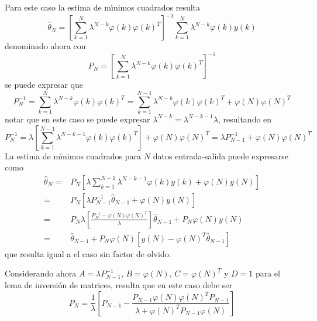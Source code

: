 Para este caso la estima de m{\'\i}nimos cuadrados resulta
\begin{equation}\label{a_2}
\hat{\theta}_N=\left[\sum_{k=1}^{N}\lambda^{N-k}\varphi(k)\varphi(k)^T\right]^{-1}\sum_{k=1}^{N}\lambda^{N-k}\varphi(k)y(k)
\end{equation}
denominado ahora con
\begin{equation}\label{a_3}
    P_{N}=\left[\sum_{k=1}^{N}\lambda^{N-k}\varphi(k)\varphi(k)^T\right]^{-1}
\end{equation}
se puede expresar que
\begin{equation}
    P^{-1}_{N}=\sum_{k=1}^{N}\lambda^{N-k}\varphi(k)\varphi(k)^T=
               \sum_{k=1}^{N-1}\lambda^{N-k}\varphi(k)\varphi(k)^T+\varphi(N)\varphi(N)^T
\end{equation}
notar que en este caso se puede expresar $\lambda^{N-k}=\lambda^{N-k-1}\lambda$, resultando en
\begin{equation}
    P^{-1}_{N}=\lambda\left[\sum_{k=1}^{N-1}\lambda^{N-k-1}\varphi(k)\varphi(k)^T\right]+\varphi(N)\varphi(N)^T=
               \lambda P^{-1}_{N-1}+\varphi(N)\varphi(N)^T
\end{equation}
La estima de m{\'\i}nimos cuadrados para $N$ datos entrada-salida puede expresarse como
\begin{equation}
\begin{split}
\hat{\theta}_{N}=&P_{N}\left[\lambda\sum_{k=1}^{N-1}\lambda^{N-k-1}\varphi(k)y(k)+\varphi(N)y(N)\right]\\
                =&P_{N}\left[\lambda P_{N-1}^{-1}\hat{\theta}_{N-1}+\varphi(N)y(N)\right]\\
                =&P_{N}\lambda \left[\frac{P_N^{-1}-\varphi(N)\varphi(N)^T}{\lambda}\right]\hat{\theta}_{N-1}+P_N\varphi(N)y(N)\\
                =&\hat{\theta}_{N-1}+P_{N}\varphi(N)\left[y(N)-\varphi(N)^T\hat{\theta}_{N-1}\right]
\end{split}
\end{equation}
que resulta igual a el caso sin factor de olvido.

Considerando ahora $A=\lambda P_{N-1}^{-1}$, $B=\varphi(N)$, $C=\varphi(N)^T$ y $D=1$ para el lema de
inversi{\'o}n de matrices, resulta que en este caso debe ser
\begin{equation}
      P_{N}=\frac{1}{\lambda}\left[P_{N-1}-\frac{P_{N-1}\varphi(N)\varphi(N)^TP_{N-1}}{\lambda+\varphi(N)^TP_{N-1}\varphi(N)}\right]
\end{equation}

